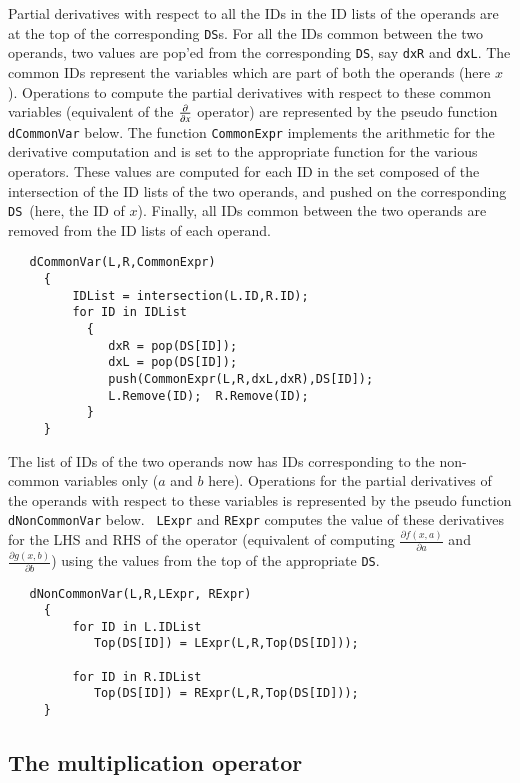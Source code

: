 \documentclass[11pt]{article}
\newcommand{\DS}{{\tt DS}}
\begin{document}
Partial derivatives with respect to all the IDs in the ID lists of the
operands are at the top of the corresponding \DS s.  For all the IDs
common between the two operands, two values are pop'ed from the
corresponding \DS, say {\tt dxR} and {\tt dxL}.  The common IDs
represent the variables which are part of both the operands (here
$x$).  Operations to compute the partial derivatives with respect to
these common variables (equivalent of the ${\partial \over \partial
x}$ operator) are represented by the pseudo function {\tt dCommonVar}
below.  The function {\tt CommonExpr} implements the arithmetic for
the derivative computation and is set to the appropriate function for
the various operators.  These values are computed for each ID in the
set composed of the intersection of the ID lists of the two operands,
and pushed on the corresponding \DS\ (here, the ID of $x$).  Finally,
all IDs common between the two operands are removed from the ID lists
of each operand.
\begin{verbatim}
   dCommonVar(L,R,CommonExpr) 
     { 
         IDList = intersection(L.ID,R.ID); 
         for ID in IDList 
           { 
              dxR = pop(DS[ID]); 
              dxL = pop(DS[ID]); 
              push(CommonExpr(L,R,dxL,dxR),DS[ID]);
              L.Remove(ID);  R.Remove(ID); 
           } 
     }
\end{verbatim}
The list of IDs of the two operands now has IDs corresponding to the
non-common variables only ($a$ and $b$ here).  Operations for the
partial derivatives of the operands with respect to these variables is
represented by the pseudo function {\tt dNonCommonVar} below.  {\tt
LExpr} and {\tt RExpr} computes the value of these derivatives for the
LHS and RHS of the operator (equivalent of computing $\frac{\partial
f(x,a)}{\partial a}$ and $\frac{\partial g(x,b)}{\partial b}$) using
the values from the top of the appropriate
\DS.
\begin{verbatim}
   dNonCommonVar(L,R,LExpr, RExpr)
     {
         for ID in L.IDList
            Top(DS[ID]) = LExpr(L,R,Top(DS[ID]));

         for ID in R.IDList
            Top(DS[ID]) = RExpr(L,R,Top(DS[ID]));
     }
\end{verbatim}
%
%
\subsection{The multiplication operator}
\end{document}
